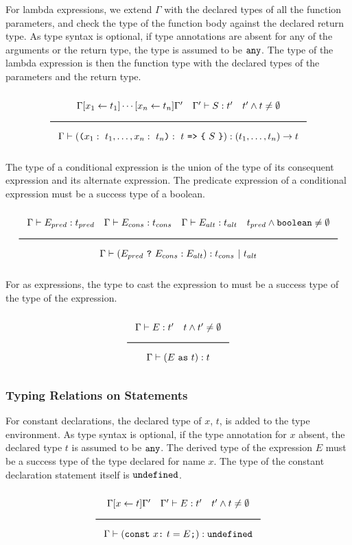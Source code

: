 For lambda expressions, we extend $\Gamma$ with the declared types of all the function parameters,
and check the type of the function body against the declared return type.
As type syntax is optional, if type annotations are absent for any of the arguments or the return type, the type is assumed to be $\texttt{any}$.
The type of the lambda expression is then the function type with the declared types of the parameters and the return type. 

\noindent
\[
  \Rule{\Gamma [x_1 \leftarrow t_1] \cdots [x_n \leftarrow t_n] \Gamma' \quad \Gamma' \vdash S : t' \quad t' \wedge t \neq \emptyset}{
    \Gamma \vdash ( \Lp  x_1:\ t_1, \ldots, x_n:\ t_n \Rp :\ t\ \texttt{=>}\ \Lc\ S\ \Rc) : (t_1, \ldots, t_n) \rightarrow t}  
\]
\noindent

The type of a conditional expression is the union of the type of its consequent expression and its alternate expression.
The predicate expression of a conditional expression must be a success type of a boolean.

\noindent
\[
  \Rule{\Gamma \vdash E_{pred} : t_{pred} \quad \Gamma \vdash E_{cons} : t_{cons} \quad \Gamma \vdash E_{alt} : t_{alt}
    \quad t_{pred} \wedge \Bool \neq \emptyset}{\Gamma \vdash (E_{pred}\ \texttt{?}\ E_{cons} : E_{alt}) : t_{cons}\ |\ t_{alt}}
\]
\noindent

For as expressions, the type to cast the expression to must be a success type of the type of the expression.

\noindent
\[
  \Rule{\Gamma \vdash E : t' \quad t \wedge t' \neq \emptyset}{\Gamma \vdash (E\ \texttt{as}\ t) : t}  
\]
\noindent

\subsubsection{Typing Relations on Statements}

For constant declarations, the declared type of $x$, $t$, is added to the type environment.
As type syntax is optional, if the type annotation for $x$ absent, the declared type $t$ is assumed to be $\texttt{any}$.
The derived type of the expression $E$ must be a success type of the type declared for name $x$.
The type of the constant declaration statement itself is $\texttt{undefined}$.

\noindent
\[
  \Rule{\Gamma [x \leftarrow t] \Gamma' \quad \Gamma' \vdash E : t' \quad t' \wedge t \neq \emptyset}{
    \Gamma \vdash (\texttt{const}\ x \texttt{:}\ t = E\texttt{;}) : \Undefined}
\]
\noindent

